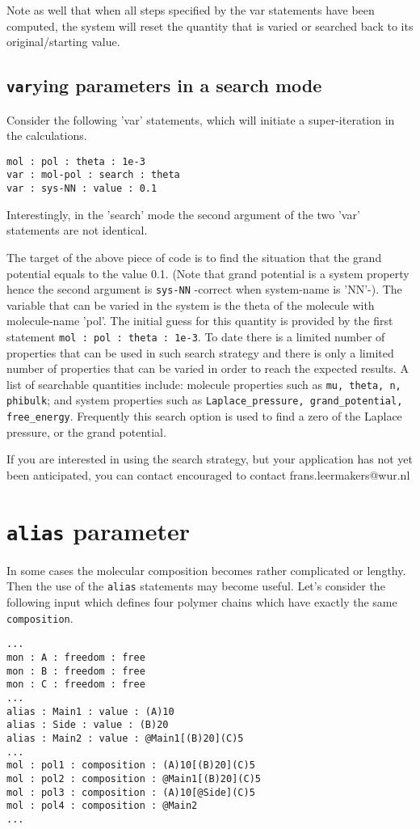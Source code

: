 \documentclass{article}
\begin{document}
Note as well that when all steps specified by the var statements have been computed, the system will reset the quantity that is varied or searched back to its original/starting value. 

\subsection{{\tt var}ying parameters in a search mode}
\label{sec:searching}
Consider the following 'var' statements, which will initiate a super-iteration in the calculations. 

\begin{verbatim}
mol : pol : theta : 1e-3
var : mol-pol : search : theta
var : sys-NN : value : 0.1
\end{verbatim}

Interestingly, in the 'search' mode the second argument of the two 'var' statements are not identical. 

The target of the above piece of code is to find the situation that the grand potential equals to the value 0.1.  (Note that grand potential is a system property hence the second argument is {\tt sys-NN} -correct when system-name is 'NN'-). The variable that can be varied in the system is the theta of the molecule with molecule-name 'pol'. The initial guess for this quantity is provided by the first statement {\tt mol : pol : theta : 1e-3}. To date there is a limited number of properties that can be used in such search strategy and there is only a limited number of properties that can be varied in order to reach the expected results. A list of searchable quantities include: molecule properties such as  {\tt mu, theta, n, phibulk}; and system properties such as {\tt Laplace\_pressure, grand\_potential, free\_energy}. Frequently this search option is used to find a zero of the Laplace pressure, or the grand potential. 

If you are interested in using the search strategy, but your application has not yet been anticipated, you can contact encouraged to contact frans.leermakers@wur.nl


\section{{\tt alias} parameter}
\label{sec:alias}
In some cases the molecular composition becomes rather complicated or lengthy. Then the use of the {\tt alias} statements may become useful. Let's consider the following input which defines four polymer chains which have exactly the same {\tt composition}. 
\begin{verbatim}
...
mon : A : freedom : free
mon : B : freedom : free
mon : C : freedom : free
...
alias : Main1 : value : (A)10
alias : Side : value : (B)20
alias : Main2 : value : @Main1[(B)20](C)5
...
mol : pol1 : composition : (A)10[(B)20](C)5
mol : pol2 : composition : @Main1[(B)20](C)5
mol : pol3 : composition : (A)10[@Side](C)5
mol : pol4 : composition : @Main2
...
\end{verbatim}
\end{document}
